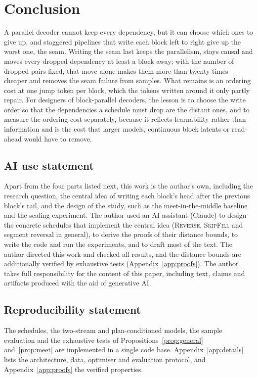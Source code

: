 \documentclass{article}
\theoremstyle{definition}
\theoremstyle{remark}
\newcommand{\name}[1]{\textup{\textsc{#1}}}
\newcommand{\sfill}{\name{SkipFill}\xspace}
\newcommand{\rev}{\name{Reverse}\xspace}
\begin{document}
\section{Conclusion}

A parallel decoder cannot keep every dependency, but it can choose which ones to give up, and staggered pipelines that write each block left to right give up the worst one, the seam.
Writing the seam last keeps the parallelism, stays causal and moves every dropped dependency at least a block away; with the number of dropped pairs fixed, that move alone makes them more than twenty times cheaper and removes the seam failure from samples.
What remains is an ordering cost at one jump token per block, which the tokens written around it only partly repair.
For designers of block-parallel decoders, the lesson is to choose the write order so that the dependencies a schedule must drop are the distant ones, and to measure the ordering cost separately, because it reflects learnability rather than information and is the cost that larger models, continuous block latents or read-ahead would have to remove.

\subsection*{AI use statement}
Apart from the four parts listed next, this work is the author's own, including the research question, the central idea of writing each block's head after the previous block's tail, and the design of the study, such as the meet-in-the-middle baseline and the scaling experiment.
The author used an AI assistant (Claude) to design the concrete schedules that implement the central idea (\rev, \sfill and segment reversal in general), to derive the proofs of their distance bounds, to write the code and run the experiments, and to draft most of the text.
The author directed this work and checked all results, and the distance bounds are additionally verified by exhaustive tests (Appendix~\ref{app:proofs}).
The author takes full responsibility for the content of this paper, including text, claims and artifacts produced with the aid of generative AI.

\subsection*{Reproducibility statement}
The schedules, the two-stream and plan-conditioned models, the sample evaluation and the exhaustive tests of Propositions~\ref{prop:general} and~\ref{prop:meet} are implemented in a single code base.
Appendix~\ref{app:details} lists the architecture, data, optimiser and evaluation protocol, and Appendix~\ref{app:proofs} the verified properties.
\end{document}
